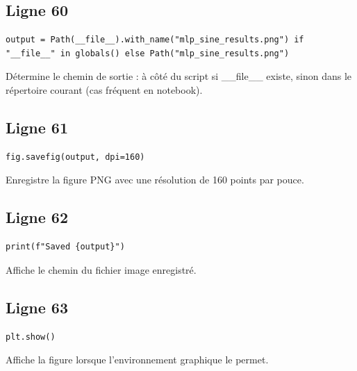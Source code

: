 \documentclass[11pt,a4paper]{article}
\begin{document}
\subsection*{Ligne 60}
\begin{lstlisting}
output = Path(__file__).with_name("mlp_sine_results.png") if "__file__" in globals() else Path("mlp_sine_results.png")
\end{lstlisting}
Détermine le chemin de sortie : à côté du script si \_\_file\_\_ existe, sinon dans le répertoire courant (cas fréquent en notebook).

\subsection*{Ligne 61}
\begin{lstlisting}
fig.savefig(output, dpi=160)
\end{lstlisting}
Enregistre la figure PNG avec une résolution de 160 points par pouce.

\subsection*{Ligne 62}
\begin{lstlisting}
print(f"Saved {output}")
\end{lstlisting}
Affiche le chemin du fichier image enregistré.

\subsection*{Ligne 63}
\begin{lstlisting}
plt.show()
\end{lstlisting}
Affiche la figure lorsque l'environnement graphique le permet.
\end{document}
